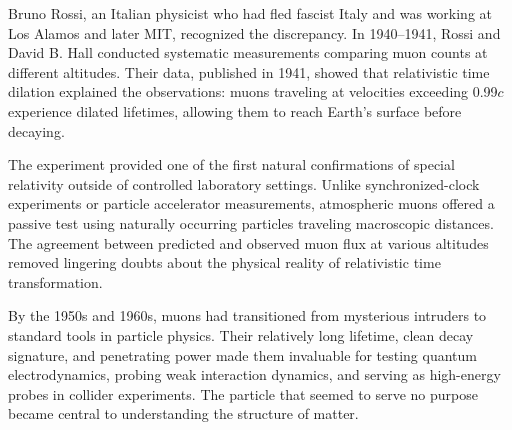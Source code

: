 \begin{historical}
Bruno Rossi, an Italian physicist who had fled fascist Italy and was working at Los Alamos and later MIT, recognized the discrepancy. In 1940–1941, Rossi and David B. Hall conducted systematic measurements comparing muon counts at different altitudes. Their data, published in 1941, showed that relativistic time dilation explained the observations: muons traveling at velocities exceeding 0.99$c$ experience dilated lifetimes, allowing them to reach Earth's surface before decaying.

The experiment provided one of the first natural confirmations of special relativity outside of controlled laboratory settings. Unlike synchronized-clock experiments or particle accelerator measurements, atmospheric muons offered a passive test using naturally occurring particles traveling macroscopic distances. The agreement between predicted and observed muon flux at various altitudes removed lingering doubts about the physical reality of relativistic time transformation.

By the 1950s and 1960s, muons had transitioned from mysterious intruders to standard tools in particle physics. Their relatively long lifetime, clean decay signature, and penetrating power made them invaluable for testing quantum electrodynamics, probing weak interaction dynamics, and serving as high-energy probes in collider experiments. The particle that seemed to serve no purpose became central to understanding the structure of matter.
\end{historical}

